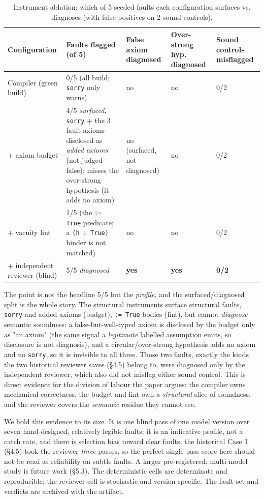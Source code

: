 \documentclass[11pt]{article}
\begin{document}
\begin{table}[ht]
\centering
\caption{Instrument ablation: which of 5 seeded faults each configuration surfaces vs. diagnoses (with false positives on 2 sound controls).}
\begin{tabularx}{\linewidth}{@{}YYYYY@{}}
\toprule
\textbf{Configuration} & \textbf{Faults flagged (of 5)} & \textbf{False axiom diagnosed} & \textbf{Over-strong hyp. diagnosed} & \textbf{Sound controls misflagged} \\
\midrule
Compiler (green build) & 0/5 (all build; \texttt{sorry} only warns) & no & no & 0/2 \\
+ axiom budget & 4/5 \emph{surfaced}, \texttt{sorry} + the 3 fault-axioms disclosed as \emph{added axioms} (not judged false); misses the over-strong hypothesis (it adds no axiom) & no (surfaced, not diagnosed) & no & 0/2 \\
+ vacuity lint & 1/5 (the \texttt{:= True} predicate; a \texttt{(h : True)} binder is not matched) & no & no & 0/2 \\
+ independent reviewer (blind) & 5/5 \emph{diagnosed} & \textbf{yes} & \textbf{yes} & \textbf{0/2} \\
\bottomrule
\end{tabularx}
\end{table}

The point is not the headline 5/5 but the \emph{profile}, and the surfaced/diagnosed split is the whole
story. The structural instruments surface structural faults, \texttt{sorry} and added axioms (budget),
\texttt{:= True} bodies (lint), but cannot \emph{diagnose} semantic soundness: a false-but-well-typed axiom is
disclosed by the budget only as "an axiom" (the same signal a \emph{legitimate} labelled assumption
emits, so disclosure is not diagnosis), and a circular/over-strong hypothesis adds no axiom and no
\texttt{sorry}, so it is invisible to all three. Those two faults, exactly the kinds the two historical
reviewer saves (§4.5) belong to, were diagnosed only by the independent reviewer, which also did not
misflag either sound control. This is direct evidence for the division of labour the paper argues:
the compiler owns mechanical correctness, the budget and lint own a \emph{structural} slice of soundness,
and the reviewer covers the \emph{semantic} residue they cannot see.

We hold this evidence to its size. It is one blind pass of one model version over seven hand-designed,
relatively legible faults; it is an indicative profile, not a catch rate, and there is selection bias
toward clear faults, the historical Case 1 (§4.5) took the reviewer \emph{three} passes, so the perfect
single-pass score here should not be read as reliability on subtle faults. A larger pre-registered,
multi-model study is future work (§5.3). The deterministic cells are determinate and reproducible; the
reviewer cell is stochastic and version-specific. The fault set and verdicts are archived with the
artifact.
\end{document}
